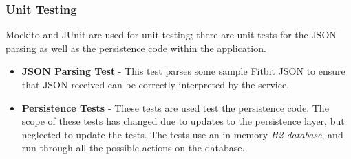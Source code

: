 \subsubsection{Unit Testing}

\par
Mockito and JUnit are used for unit testing; there are unit tests for the JSON parsing as well as the persistence code within the application.

\begin{itemize}
	\item \textbf{JSON Parsing Test} - This test parses some sample Fitbit JSON to ensure that JSON received can be correctly interpreted by the service.

	\item \textbf{Persistence Tests} - These tests are used test the persistence code. The scope of these tests has changed due to updates to the persistence layer, but neglected to update the tests. The tests use an in memory \textit{H2 database}\cite{H2}, and run through all the possible actions on the database.
\end{itemize}


